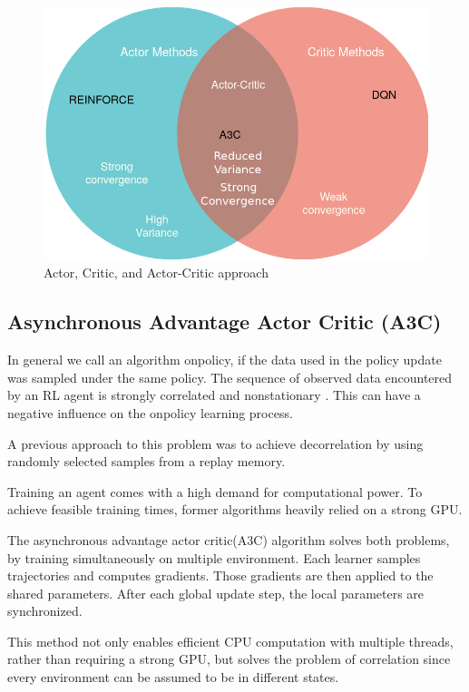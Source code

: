 \begin{figure}
\includegraphics[scale=0.5]{bilder/actorcritic1.png}
\caption{Actor, Critic, and Actor-Critic approach}
\end{figure}

\pagebreak



\subsection{Asynchronous Advantage Actor Critic (A3C)}

In general we call an algorithm onpolicy, if the data used in the policy update was sampled under the same policy. The sequence of observed data encountered by an RL agent is strongly correlated and nonstationary \citep{A3C}. This can have a negative influence on the onpolicy learning process.

A previous approach to this problem was to achieve decorrelation by using randomly selected samples from a replay memory. \citep{mnih2015atari}

Training an agent comes with a high demand for computational power. To achieve feasible training times, former algorithms heavily relied on a strong GPU.

The asynchronous advantage actor critic(A3C) algorithm solves both problems, by training simultaneously on multiple environment.
Each learner samples trajectories and computes gradients. Those gradients are then applied to the shared parameters. 
After each global update step, the local parameters are synchronized.

This method not only enables efficient CPU computation with multiple threads, rather than requiring a strong GPU, but solves the problem of correlation since every environment can be assumed to be in different states.

